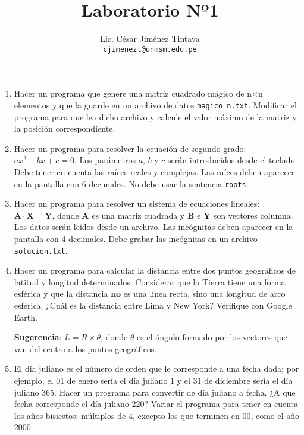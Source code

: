 \documentclass[a4paper,11pt,twoside,final]{article}
\begin{document}
    \title{Laboratorio Nº1}
    \author{Lic. César Jiménez Tintaya\\ \small{\texttt{cjimenezt@unmsm.edu.pe}}}
    \date{}
    \maketitle

    \begin{enumerate}
        \item Hacer un programa que genere una matriz cuadrado mágico de n×n elementos
        y que la guarde en un archivo de datos \texttt{magico\_n.txt}. Modificar el
        programa para que lea dicho archivo y calcule el valor máximo de la matriz
        y la posición correspondiente.

        \item Hacer un programa para resolver la ecuación de segundo grado:
        $ax^2+bx+c=0$. Los parámetros $a$, $b$ y $c$ serán introducidos desde
        el teclado. Debe tener en cuenta las raíces reales y complejas. Las
        raíces deben aparecer en la pantalla con 6 decimales. No debe usar la
        sentencia \texttt{roots}.

        \item Hacer un programa para resolver un sistema de ecuaciones
        lineales: $\mathbf{A}\cdot\mathbf{X}=\mathbf{Y}$, donde $\mathbf{A}$ es
        una matriz cuadrada y $\mathbf{B}$ e $\mathbf{Y}$ son vectores columna.
        Los datos serán leídos desde un archivo. Las incógnitas deben aparecer
        en la pantalla con 4 decimales. Debe grabar las incógnitas en un
        archivo \texttt{solucion.txt}.

        \item Hacer un programa para calcular la distancia entre dos puntos
        geográficos de latitud y longitud determinados. Considerar que la
        Tierra tiene una forma esférica y que la distancia \textbf{no} es una
        línea recta, sino una longitud de arco esférica. ¿Cuál es la distancia
        entre Lima y New York? Verifique con Google Earth.

        \textbf{Sugerencia}: $L=R\times\theta$, donde $\theta$ es el ángulo
        formado por los vectores que van del centro a los puntos geográficos.

        \item El día juliano es el número de orden que le corresponde a una
        fecha dada; por ejemplo, el 01 de enero sería el día juliano 1 y el 31
        de diciembre sería el día juliano 365. Hacer un programa para
        convertir de día juliano a fecha. ¿A que fecha corresponde el día
        juliano 220? Variar el programa para tener en cuenta los años
        bisiestos: múltiplos de 4, excepto los que terminen en 00, como el
        año 2000.


\end{enumerate}
\end{document}
